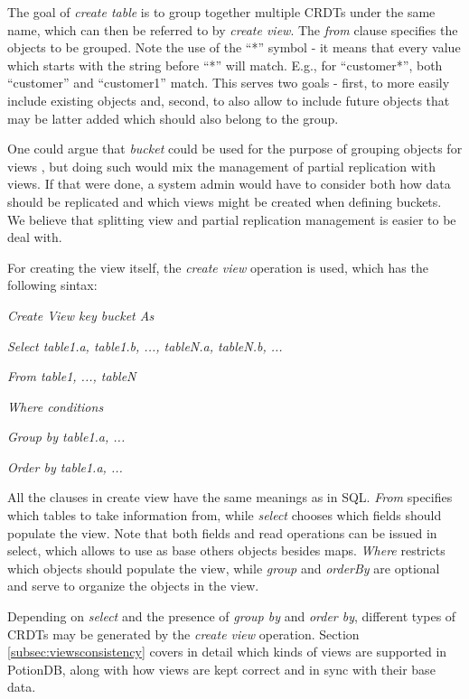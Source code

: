 \documentclass{vldb}
\newcommand{\emphvspace}{0.5\baselineskip}
\newcommand{\firstblockemph}[1]{\vspace{\emphvspace}\hspace{2em}\emph{#1}}
\newcommand{\middleblockemph}[1]{\hspace{2em}\emph{#1}}
\newcommand{\lastblockemph}[1]{\hspace{2em}\emph{#1}\vspace{\emphvspace}}
\begin{document}
The goal of \emph{create table} is to group together multiple CRDTs under the same name, which can then be referred to by \emph{create view}.
The \emph{from} clause specifies the objects to be grouped.
Note the use of the ``*'' symbol - it means that every value which starts with the string before ``*'' will match.
E.g., for ``customer*'', both ``customer'' and ``customer1'' match.
This serves two goals - first, to more easily include existing objects and, second, to also allow to include future objects that may be latter added which should also belong to the group.

One could argue that \emph{bucket} could be used for the purpose of grouping objects for views , but doing such would mix the management of partial replication with views.
If that were done, a system admin would have to consider both how data should be replicated and which views might be created when defining buckets.
We believe that splitting view and partial replication management is easier to be deal with.

For creating the view itself, the \emph{create view} operation is used, which has the following sintax:

\firstblockemph{Create View key bucket As}

\middleblockemph{Select table1.a, table1.b, ..., tableN.a, tableN.b, ...}

\middleblockemph{From table1, ..., tableN}

\middleblockemph{Where conditions}

\middleblockemph{Group by table1.a, ...}

\lastblockemph{Order by table1.a, ...}

All the clauses in create view have the same meanings as in SQL.
\emph{From} specifies which tables to take information from, while \emph{select} chooses which fields should populate the view. 
Note that both fields and read operations can be issued in select, which allows to use as base others objects besides maps.
\emph{Where} restricts which objects should populate the view, while \emph{group} and \emph{orderBy} are optional and serve to organize the objects in the view.

Depending on \emph{select} and the presence of \emph{group by} and \emph{order by}, different types of CRDTs may be generated by the \emph{create view} operation.
Section \ref{subsec:viewsconsistency} covers in detail which kinds of views are supported in PotionDB, along with how views are kept correct and in sync with their base data.
\end{document}
